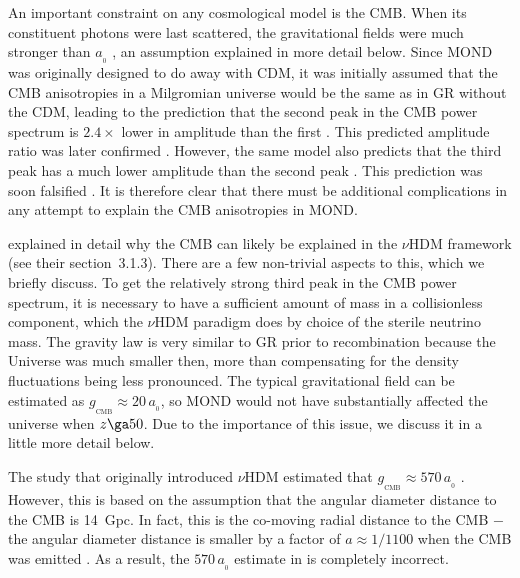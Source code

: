\documentclass[fleqn,usenatbib,useAMS]{mnras} %
\begin{document}
An important constraint on any cosmological model is the CMB. When its constituent photons were last scattered, the gravitational fields were much stronger than $a_{_0}$ \citep[see figure~1 of][]{Sanders_1998_cosmology}, an assumption explained in more detail below. Since MOND was originally designed to do away with CDM, it was initially assumed that the CMB anisotropies in a Milgromian universe would be the same as in GR without the CDM, leading to the prediction that the second peak in the CMB power spectrum is $2.4\times$ lower in amplitude than the first \citep{McGaugh_1999}. This predicted amplitude ratio was later confirmed \citep{McGaugh_2004}. However, the same model also predicts that the third peak has a much lower amplitude than the second peak \citep{McGaugh_1999}. This prediction was soon falsified \citep{Spergel_2007}. It is therefore clear that there must be additional complications in any attempt to explain the CMB anisotropies in MOND.

\citet{Haslbauer_2020} explained in detail why the CMB can likely be explained in the $\nu$HDM framework (see their section~3.1.3). There are a few non-trivial aspects to this, which we briefly discuss. To get the relatively strong third peak in the CMB power spectrum, it is necessary to have a sufficient amount of mass in a collisionless component, which the $\nu$HDM paradigm does by choice of the sterile neutrino mass. The gravity law is very similar to GR prior to recombination because the Universe was much smaller then, more than compensating for the density fluctuations being less pronounced. The typical gravitational field can be estimated as $g_{_\text{CMB}} \approx 20 \, a_{_0}$, so MOND would not have substantially affected the universe when $z \ga 50$. Due to the importance of this issue, we discuss it in a little more detail below.

The study that originally introduced $\nu$HDM estimated that $g_{_{\text{CMB}}} \approx 570 \, a_{_0}$ \citep[section~1 of][]{Angus_2009}. However, this is based on the assumption that the angular diameter distance to the CMB is 14~Gpc. In fact, this is the co-moving radial distance to the CMB $-$ the angular diameter distance is smaller by a factor of $a \approx 1/1100$ when the CMB was emitted \citep[section~3 of][]{Clarkson_2014}. As a result, the $570 \, a_{_0}$ estimate in \citet{Angus_2009} is completely incorrect.
\end{document}
